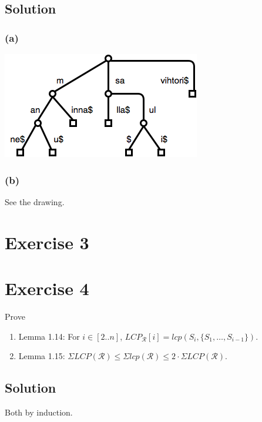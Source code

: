 \documentclass[10pt]{article}
\begin{document}
\subsection*{Solution}
\subsubsection*{(a)}
\begin{center}
\includegraphics[scale=0.65]{CompactTrie}
\end{center}

\subsubsection*{(b)}
See the drawing.

\section*{Exercise 3}

\section*{Exercise 4}
\color{blue}
Prove
\begin{enumerate}[label=(\alph*)]
\item Lemma 1.14: For $i \in [2..n]$, $LCP_{\mathcal{R}}[i] = lcp(S_i, \{ S_1, \dots, S_{i - 1} \})$.
\item Lemma 1.15: $\Sigma LCP(\mathcal{R}) \leq \Sigma lcp(\mathcal{R}) \leq 2 \cdot \Sigma LCP(\mathcal{R})$.
\end{enumerate}
\color{black}
\subsection*{Solution}
Both by induction.
\end{document}
